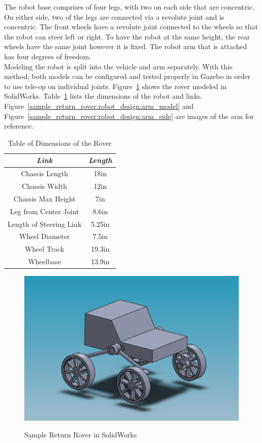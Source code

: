 The robot base comprises of four legs, with two on each side that are concentric. On either side, two of the legs are connected via a revolute joint and is concentric. The front wheels have a revolute joint connected to the wheels so that the robot can steer left or right. To have the robot at the same height, the rear wheels have the same joint however it is fixed. The robot arm that is attached has four degrees of freedom.\\

Modeling the robot is split into the vehicle and arm separately. With this method, both models can be configured and tested properly in Gazebo in order to use tele-op on individual joints. Figure~\ref{sample_return_rover:robot_design:srr_cad} shows the rover modeled in SolidWorks. Table~\ref{sample_return_rover:robot_design:srr_dimensions} lists the dimensions of the robot and links. Figure~\ref{sample_return_rover:robot_design:arm_model} and Figure~\ref{sample_return_rover:robot_design:arm_side} are images of the arm for reference.

\begin{table}[H]
	\centering
	\begin{tabular}{|c|c|} 
		\hline 
		\textit{Link} & \textit{Length} \\
		\hline
		Chassis Length & 18in \\
		Chassis Width & 12in \\
		Chassis Max Height & 7in \\
		Leg from Center Joint & 8.6in \\
		Length of Steering Link & 5.25in \\ 
		Wheel Diameter & 7.5in \\
		Wheel Track & 19.3in \\
		Wheelbase & 13.9in \\
		\hline
	\end{tabular}
	\caption{Table of Dimensions of the Rover}
	\label{sample_return_rover:robot_design:srr_dimensions}
\end{table}

\begin{figure}[H]
	\centering
	\includegraphics[scale=0.45]{sections/robot-design/images/SRR_model.png}
	\label{sample_return_rover:robot_design:srr_cad}
	\caption{Sample Return Rover in SolidWorks}
\end{figure}

